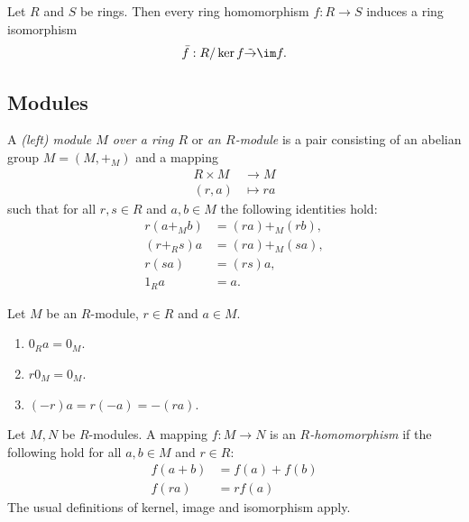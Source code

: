 \documentclass{article}
\begin{document}
\begin{theorem}
	Let $R$ and $S$ be rings. Then every ring homomorphism $f:R\to S$ induces a ring isomorphism
	\begin{align*}
		\bar f:R/\ker f \tilde\to \im f.
	\end{align*}
\end{theorem}

\subsection{Modules}

\begin{definition}
	A \emph{(left) module $M$ over a ring $R$} or \emph{an $R$-module} is a pair consisting of an
	abelian group $M=(M,+_M)$ and a mapping
	\begin{align*}
		R\times M & \to M      \\
		(r,a)     & \mapsto ra
	\end{align*}
	such that for all $r,s\in R$ and $a,b\in M$ the following identities hold:
	\begin{align*}
		r(a +_M b) & = (ra) +_M (rb), \\
		(r+_Rs)a   & = (ra) +_M (sa), \\
		r(sa)      & = (rs)a,         \\
		1_Ra       & = a.
	\end{align*}
\end{definition}

\begin{lemma}[Notes 3.7.8]
	Let $M$ be an $R$-module, $r\in R$ and $a\in M$.
	\begin{enumerate}
		\item $0_Ra=0_M$.
		\item $r0_M=0_M$.
		\item $(-r)a=r(-a)=-(ra)$.
	\end{enumerate}
\end{lemma}

\begin{definition}
	Let $M,N$ be $R$-modules. A mapping $f:M\to N$ is an \emph{$R$-homomorphism} if the following
	hold for all $a,b\in M$ and $r\in R$:
	\begin{align*}
		f(a+b) & = f(a) + f(b) \\
		f(ra)  & = rf(a)
	\end{align*}
	The usual definitions of kernel, image and isomorphism apply.
\end{definition}
\end{document}
